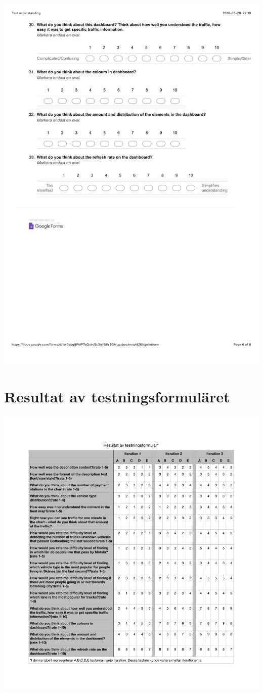 \documentclass[12pt]{kththesis}
\begin{document}
\begin{appendices}
\includegraphics[width=1\textwidth]{TextUnderstanding6.pdf}
\newpage
\section{Resultat av testningsformuläret}
\includegraphics[width=1\textwidth]{TrafficDashboard.pdf}


\end{appendices}
\end{document}
